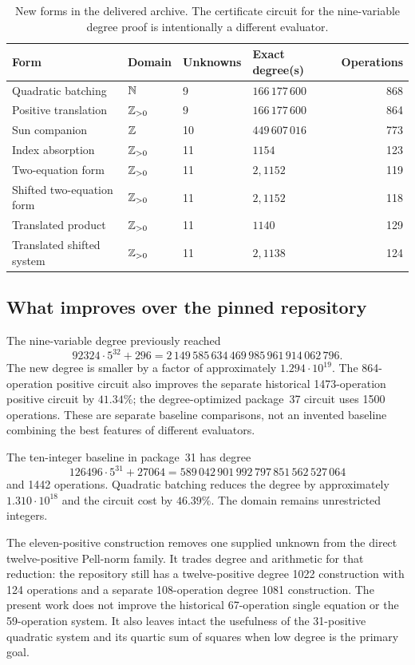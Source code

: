 \begin{table}[htbp]
\centering
\small
\begin{tabular}{@{}llllr@{}}
\toprule
Form & Domain & Unknowns & Exact degree(s) & Operations\\
\midrule
Quadratic batching & $\mathbb N$ & 9 & $166\,177\,600$ & 868\\
Positive translation & $\mathbb Z_{>0}$ & 9 & $166\,177\,600$ & 864\\
Sun companion & $\mathbb Z$ & 10 & $449\,607\,016$ & 773\\
Index absorption & $\mathbb Z_{>0}$ & 11 & $1154$ & 123\\
Two-equation form & $\mathbb Z_{>0}$ & 11 & $2,1152$ & 119\\
Shifted two-equation form & $\mathbb Z_{>0}$ & 11 & $2,1152$ & 118\\
Translated product & $\mathbb Z_{>0}$ & 11 & $1140$ & 129\\
Translated shifted system & $\mathbb Z_{>0}$ & 11 & $2,1138$ & 124\\
\bottomrule
\end{tabular}
\caption{New forms in the delivered archive. The certificate circuit for
the nine-variable degree proof is intentionally a different evaluator.}
\label{tab:results}
\end{table}

\subsection{What improves over the pinned repository}

The nine-variable degree previously reached
\[
 92324\cdot5^{32}+296
 =2\,149\,585\,634\,469\,985\,961\,914\,062\,796.
\]
The new degree is smaller by a factor of approximately
$1.294\cdot10^{19}$. The 864-operation positive circuit also improves
the separate historical 1473-operation positive circuit by $41.34\%$;
the degree-optimized package~37 circuit uses 1500 operations. These are
separate baseline comparisons, not an invented baseline combining the
best features of different evaluators.

The ten-integer baseline in package~31 has degree
\[
 126496\cdot5^{31}+27064
 =589\,042\,901\,992\,797\,851\,562\,527\,064
\]
and 1442 operations. Quadratic batching reduces the degree by
approximately $1.310\cdot10^{18}$ and the circuit cost by $46.39\%$.
The domain remains unrestricted integers.

The eleven-positive construction removes one supplied unknown from the
direct twelve-positive Pell-norm family. It trades degree and arithmetic
for that reduction: the repository still has a twelve-positive degree
1022 construction with 124 operations and a separate 108-operation
degree 1081 construction. The present work does not improve the
historical 67-operation single equation or the 59-operation system.
It also leaves intact the usefulness of the 31-positive quadratic system
and its quartic sum of squares when low degree is the primary goal.

